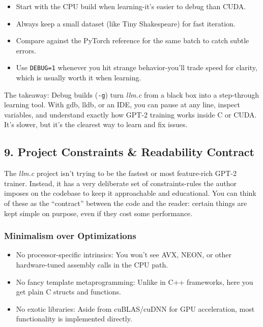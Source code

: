 \documentclass[
  letterpaper,
  DIV=11,
  numbers=noendperiod]{scrreprt}
\providecommand{\tightlist}{%
  \setlength{\itemsep}{0pt}\setlength{\parskip}{0pt}}
\begin{document}
\begin{itemize}
\tightlist
\item
  Start with the CPU build when learning-it's easier to debug than CUDA.
\item
  Always keep a small dataset (like Tiny Shakespeare) for fast
  iteration.
\item
  Compare against the PyTorch reference for the same batch to catch
  subtle errors.
\item
  Use \texttt{DEBUG=1} whenever you hit strange behavior-you'll trade
  speed for clarity, which is usually worth it when learning.
\end{itemize}

The takeaway: Debug builds (\texttt{-g}) turn \emph{llm.c} from a black
box into a step-through learning tool. With gdb, lldb, or an IDE, you
can pause at any line, inspect variables, and understand exactly how
GPT-2 training works inside C or CUDA. It's slower, but it's the
clearest way to learn and fix issues.

\subsection{9. Project Constraints \& Readability
Contract}\label{project-constraints-readability-contract}

The \emph{llm.c} project isn't trying to be the fastest or most
feature-rich GPT-2 trainer. Instead, it has a very deliberate set of
constraints-rules the author imposes on the codebase to keep it
approachable and educational. You can think of these as the ``contract''
between the code and the reader: certain things are kept simple on
purpose, even if they cost some performance.

\subsubsection{Minimalism over
Optimizations}\label{minimalism-over-optimizations}

\begin{itemize}
\tightlist
\item
  No processor-specific intrinsics: You won't see AVX, NEON, or other
  hardware-tuned assembly calls in the CPU path.
\item
  No fancy template metaprogramming: Unlike in C++ frameworks, here you
  get plain C structs and functions.
\item
  No exotic libraries: Aside from cuBLAS/cuDNN for GPU acceleration,
  most functionality is implemented directly.
\end{itemize}
\end{document}
